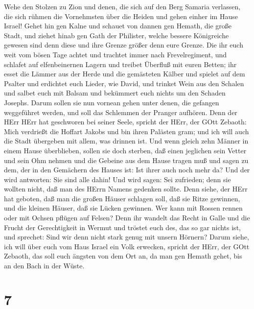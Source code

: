  Wehe den Stolzen zu Zion und denen, die sich auf den Berg
Samaria verlassen, die sich rühmen die Vornehmsten über die Heiden und
gehen einher im Hause Israel!  Gehet hin gen Kalne und
schauet von dannen gen Hemath, die große Stadt, und ziehet hinab gen
Gath der Philister, welche bessere Königreiche gewesen sind denn diese
und ihre Grenze größer denn eure Grenze.  Die ihr euch weit
vom bösen Tage achtet und trachtet immer nach Frevelregiment,
 und schlafet auf elfenbeinernen Lagern und treibet Überfluß
mit euren Betten; ihr esset die Lämmer aus der Herde und die gemästeten
Kälber  und spielet auf dem Psalter und erdichtet euch
Lieder, wie David,  und trinket Wein aus den Schalen und
salbet euch mit Balsam und bekümmert euch nichts um den Schaden Josephs.
 Darum sollen sie nun vornean gehen unter denen, die
gefangen weggeführet werden, und soll das Schlemmen der Pranger
aufhören.  Denn der HErr HErr hat geschworen bei seiner
Seele, spricht der HErr, der GOtt Zebaoth: Mich verdrießt die Hoffart
Jakobs und bin ihren Palästen gram; und ich will auch die Stadt
übergeben mit allem, was drinnen ist.  Und wenn gleich zehn
Männer in einem Hause überblieben, sollen sie doch sterben,
 daß einen jeglichen sein Vetter und sein Ohm nehmen und
die Gebeine aus dem Hause tragen muß und sagen zu dem, der in den
Gemächern des Hauses ist: Ist ihrer auch noch mehr da? Und der wird
antworten: Sie sind alle dahin! Und wird sagen: Sei zufrieden; denn sie
wollten nicht, daß man des HErrn Namens gedenken sollte. 
Denn siehe, der HErr hat geboten, daß man die großen Häuser schlagen
soll, daß sie Ritze gewinnen, und die kleinen Häuser, daß sie Lücken
gewinnen.  Wer kann mit Rossen rennen oder mit Ochsen
pflügen auf Felsen? Denn ihr wandelt das Recht in Galle und die Frucht
der Gerechtigkeit in Wermut  und tröstet euch des, das so
gar nichts ist, und sprechet: Sind wir denn nicht stark genug mit unsern
Hörnern?  Darum siehe, ich will über euch vom Haus Israel
ein Volk erwecken, spricht der HErr, der GOtt Zebaoth, das soll euch
ängsten von dem Ort an, da man gen Hemath gehet, bis an den Bach in der
Wüste.

\hypertarget{section-6}{%
\section{7}\label{section-6}}

